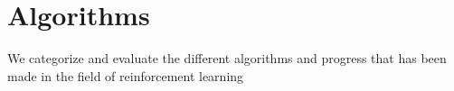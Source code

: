 \section{Algorithms}\label{sec:rl-algorithms}
We categorize and evaluate the different algorithms and progress that has been made in the field of reinforcement learning 





